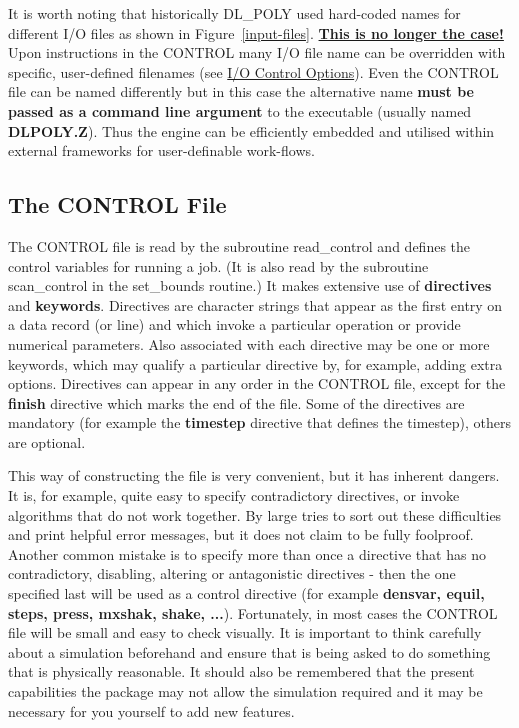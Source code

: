 It is worth noting that historically DL\_POLY used hard-coded names
for different I/O files as shown in Figure~\ref{input-files}.
\uline{{\bf This is no longer the case!}}  Upon instructions in
the CONTROL many I/O file name can be overridden with specific,
user-defined filenames (see \hyperref[io]{I/O Control Options}).
Even the CONTROL file can be named differently but in this case the
alternative name {\bf must be passed as a command line argument}
to the \D executable (usually named {\bf DLPOLY.Z}).  Thus the
\D engine can be efficiently embedded and utilised within external
frameworks for user-definable work-flows.

\subsection{The CONTROL File}
\label{control-file}

The CONTROL file is read by the subroutine {\sc read\_control} and
defines the control variables for running a \D job.  (It is also
read by the subroutine {\sc scan\_control} in the {\sc
set\_bounds} routine.)  It makes extensive use of {\bf directives}
and {\bf keywords}.  Directives are character strings that appear
as the first entry on a data record (or line) and which invoke a
particular operation or provide numerical parameters.  Also
associated with each directive may be one or more keywords, which
may qualify a particular directive by, for example, adding extra
options.  Directives can appear in any order in the CONTROL file,
except for the {\bf finish} directive which marks the end of the
file.  Some of the directives are mandatory (for example the {\bf
timestep} directive that defines the timestep), others are
optional.

This way of constructing the file is very convenient, but it has
inherent dangers.  It is, for example, quite easy to specify
contradictory directives, or invoke algorithms
that do not work together.  By large \D tries to sort out these
difficulties and print helpful error messages, but it does not
claim to be fully foolproof.  Another common mistake is to specify
more than once a directive that has no contradictory, disabling,
altering or antagonistic directives - then the one specified
last will be used as a control directive (for example
{\bf densvar, equil, steps, press, mxshak, shake, ...}).
Fortunately, in most cases the CONTROL file will be small and
easy to check visually.  It is important to think carefully about
a simulation beforehand and ensure that \D is being asked to do
something that is physically reasonable.  It should also be
remembered that the present capabilities the package may not
allow the simulation required and it may be necessary for you
yourself to add new features.

